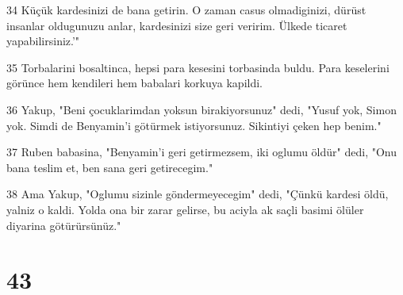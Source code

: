 \par 34 Küçük kardesinizi de bana getirin. O zaman casus olmadiginizi, dürüst insanlar oldugunuzu anlar, kardesinizi size geri veririm. Ülkede ticaret yapabilirsiniz.'"
\par 35 Torbalarini bosaltinca, hepsi para kesesini torbasinda buldu. Para keselerini görünce hem kendileri hem babalari korkuya kapildi.
\par 36 Yakup, "Beni çocuklarimdan yoksun birakiyorsunuz" dedi, "Yusuf yok, Simon yok. Simdi de Benyamin'i götürmek istiyorsunuz. Sikintiyi çeken hep benim."
\par 37 Ruben babasina, "Benyamin'i geri getirmezsem, iki oglumu öldür" dedi, "Onu bana teslim et, ben sana geri getirecegim."
\par 38 Ama Yakup, "Oglumu sizinle göndermeyecegim" dedi, "Çünkü kardesi öldü, yalniz o kaldi. Yolda ona bir zarar gelirse, bu aciyla ak saçli basimi ölüler diyarina götürürsünüz."

\chapter{43}

